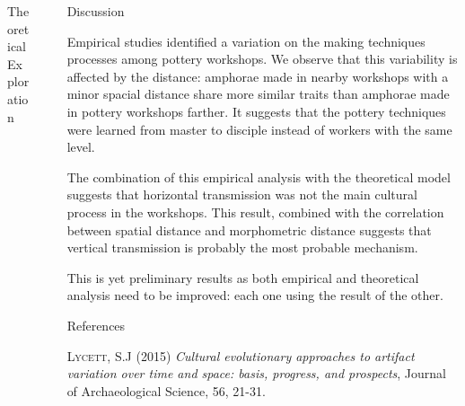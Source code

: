 \documentclass[final]{beamer}
\newlength{\sepwid}
\newlength{\onecolwid}
\newlength{\twocolwid}
\begin{document}
\begin{frame}[t]
\begin{columns}[t]
\begin{column}{\twocolwid}
\begin{block}{Theoretical Exploration}
\end{block}
\end{column}


\begin{column}{\sepwid}\end{column} %

\begin{column}{\onecolwid} %

\begin{block}{Discussion}
\justify

Empirical studies identified a variation on the making techniques processes among pottery workshops. We observe that this variability is affected by the distance: amphorae made in nearby workshops with a minor spacial distance share more similar traits than amphorae made in pottery workshops farther. It suggests that the pottery techniques were learned from master to disciple instead of workers with the same level. 

The combination of this empirical analysis with the theoretical model suggests that horizontal transmission was not the main cultural process in the workshops. This result, combined with the correlation between spatial distance and morphometric distance suggests that vertical transmission is probably the most probable mechanism.

This is yet  preliminary results as both empirical and theoretical analysis need to be improved: each one using the result of the other. 

 
\end{block}

\begin{block}{References}
\small

\begin{thebibliography}{50}

\textsc{Lycett, S.J (2015)}
\textit{Cultural evolutionary approaches to artifact variation over time and space: basis, progress, and prospects}, Journal of Archaeological Science, 56, 21-31.


\end{thebibliography}
\end{block}
\end{column}
\end{columns}
\end{frame}
\end{document}
